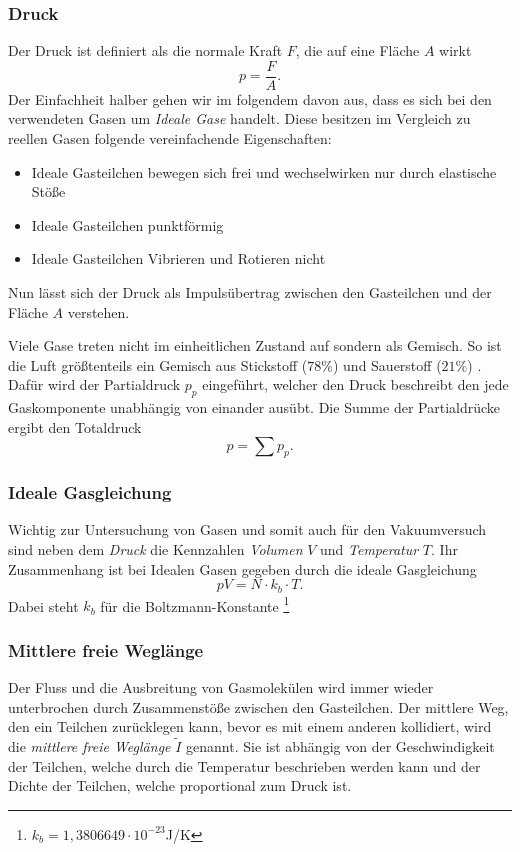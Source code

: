 \subsubsection*{Druck}
Der Druck ist definiert als die normale Kraft $F$, die auf eine Fläche $A$ wirkt
\begin{equation}
    p = \frac{F}{A}. \label{eq:Druck}
\end{equation}
Der Einfachheit halber gehen wir im folgendem davon aus, 
dass es sich bei den verwendeten Gasen um \textit{Ideale Gase} handelt.
Diese besitzen im Vergleich zu reellen Gasen folgende vereinfachende Eigenschaften:
\begin{itemize}
    \item Ideale Gasteilchen bewegen sich frei und wechselwirken nur durch elastische Stöße
    \item Ideale Gasteilchen punktförmig
    \item Ideale Gasteilchen Vibrieren und Rotieren nicht 
\end{itemize}
Nun lässt sich der Druck als Impulsübertrag zwischen den Gasteilchen und der Fläche $A$ verstehen.  

Viele Gase treten nicht im einheitlichen Zustand auf sondern als Gemisch.
So ist die Luft größtenteils ein Gemisch aus Stickstoff ($78\%$) und Sauerstoff ($21\%$) \cite{luft}. 
Dafür wird der Partialdruck $p_p$ eingeführt, 
welcher den Druck beschreibt den jede Gaskomponente unabhängig von einander ausübt.
Die Summe der Partialdrücke ergibt den Totaldruck
\begin{equation}
    p = \sum p_p.
\end{equation}

\subsubsection*{Ideale Gasgleichung}
Wichtig zur Untersuchung von Gasen 
und somit auch für den Vakuumversuch sind neben dem \textit{Druck} die Kennzahlen \textit{Volumen} $V$
und \textit{Temperatur} $T$.
Ihr Zusammenhang ist bei Idealen Gasen gegeben durch die ideale Gasgleichung
\begin{equation}
    pV=N\cdot k_b\cdot T. \label{eq:idealgaß}
\end{equation}
Dabei steht $k_b$ für die Boltzmann-Konstante \footnote{$k_b = 1,3806649\cdot10^{-23}$J/K}

\subsubsection*{Mittlere freie Weglänge}
Der Fluss und die Ausbreitung von Gasmolekülen wird immer wieder unterbrochen durch Zusammenstöße zwischen den Gasteilchen.
Der mittlere Weg, 
den ein Teilchen zurücklegen kann, bevor es mit einem anderen kollidiert, wird die \textit{mittlere freie Weglänge} $\tilde{I}$ genannt.
Sie ist abhängig von der Geschwindigkeit der Teilchen, welche durch die Temperatur beschrieben werden kann 
und der Dichte der Teilchen, welche proportional zum Druck ist.  

